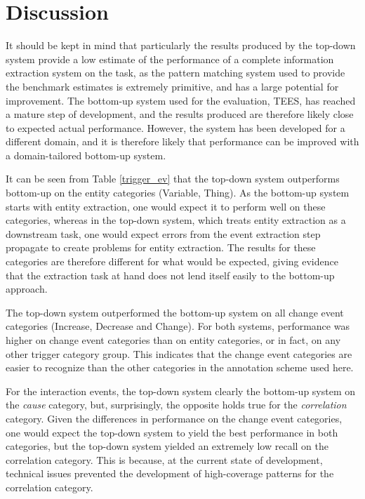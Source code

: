 \section{Discussion}

It should be kept in mind that particularly the results produced by the top-down system provide a low estimate of the performance of a complete information extraction system on the task, as the pattern matching system used to provide the benchmark estimates is extremely primitive, and has a large potential for improvement. The bottom-up system used for the evaluation, TEES, has reached a mature step of development, and the results produced are therefore likely close to expected actual performance. However, the system has been developed for a different domain, and it is therefore likely that performance can be improved with a domain-tailored bottom-up system.


It can be seen from Table \ref{trigger_ev} that the top-down system outperforms bottom-up on the entity categories (Variable, Thing). As the bottom-up system starts with entity extraction, one would expect it to perform well on these categories, whereas in the top-down system, which treats entity extraction as a downstream task, one would expect errors from the event extraction step propagate to create problems for entity extraction. The results for these categories are therefore different for what would be expected, giving evidence that the extraction task at hand does not lend itself easily to the bottom-up approach. 

The top-down system outperformed the bottom-up system on all change event categories (Increase, Decrease and Change). For both systems, performance was higher on change event categories than on entity categories, or in fact, on any other trigger category group. This indicates that the change event categories are easier to recognize than the other categories in the annotation scheme used here.

For the interaction events, the top-down system clearly the bottom-up system on the \emph{cause} category, but, surprisingly, the opposite holds true for the \emph{correlation} category. Given the differences in performance on the change event categories, one would expect the top-down system to yield the best performance in both categories, but the top-down system yielded an extremely low recall on the correlation category. This is because, at the current state of development, technical issues prevented the development of high-coverage patterns for the correlation category.

